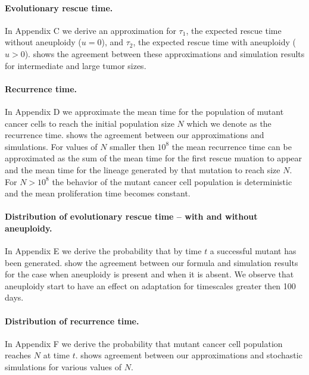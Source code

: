 \documentclass[12pt]{extarticle}
\begin{document}
\paragraph{Evolutionary rescue time.}
In Appendix C we derive an approximation for $\tau_1$, the expected rescue time without aneuploidy ($u=0$), and $\tau_2$, the expected rescue time with aneuploidy ($u>0$).  shows the agreement between these approximations and simulation results for intermediate and large tumor sizes.

\paragraph{Recurrence time.}

In Appendix D we approximate the mean time for the population of mutant cancer cells to reach the initial population size $N$ which we denote as the recurrence time.  shows the agreement between our approximations and simulations. For values of $N$ smaller then $10^8$ the mean recurrence time can be approximated as the sum of the mean time for the first rescue muation to appear and the mean time for the lineage generated by that mutation to reach size $N$. For $N>10^8$ the behavior of the mutant cancer cell population is deterministic and the mean proliferation time becomes constant.

\paragraph{Distribution of evolutionary rescue time -- with and without aneuploidy.}

In Appendix E we derive the probability that by time $t$ a successful mutant has been generated.  show the agreement between our formula and simulation results for the case when aneuploidy is present and when it is absent.  We observe that aneuploidy start to have an effect on adaptation for timescales greater then 100 days.
\paragraph{Distribution of  recurrence time.}
In Appendix F we derive the probability that mutant cancer cell population reaches $N$ at time $t$.  shows agreement between our approximations and stochastic simulations for various values of $N$. 
\end{document}
